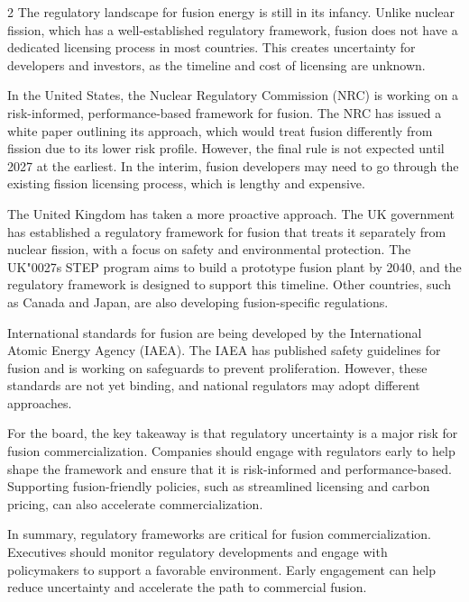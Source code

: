 \documentclass[10pt,a4paper]{article}
\newcommand{\BOApos}{{\BOQuoteFont\char"0027}}
\begin{document}
\begin{multicols}{2}
{\small The regulatory landscape for fusion energy is still in its infancy. Unlike nuclear fission, which has a well-established regulatory framework, fusion does not have a dedicated licensing process in most countries. This creates uncertainty for developers and investors, as the timeline and cost of licensing are unknown.}\par
{\small In the United States, the Nuclear Regulatory Commission (NRC) is working on a risk-informed, performance-based framework for fusion. The NRC has issued a white paper outlining its approach, which would treat fusion differently from fission due to its lower risk profile. However, the final rule is not expected until 2027 at the earliest. In the interim, fusion developers may need to go through the existing fission licensing process, which is lengthy and expensive.}\par
{\small The United Kingdom has taken a more proactive approach. The UK government has established a regulatory framework for fusion that treats it separately from nuclear fission, with a focus on safety and environmental protection. The UK\BOApos{}s STEP program aims to build a prototype fusion plant by 2040, and the regulatory framework is designed to support this timeline. Other countries, such as Canada and Japan, are also developing fusion-specific regulations.}\par
{\small International standards for fusion are being developed by the International Atomic Energy Agency (IAEA). The IAEA has published safety guidelines for fusion and is working on safeguards to prevent proliferation. However, these standards are not yet binding, and national regulators may adopt different approaches.}\par
{\small For the board, the key takeaway is that regulatory uncertainty is a major risk for fusion commercialization. Companies should engage with regulators early to help shape the framework and ensure that it is risk-informed and performance-based. Supporting fusion-friendly policies, such as streamlined licensing and carbon pricing, can also accelerate commercialization.}\par
{\small In summary, regulatory frameworks are critical for fusion commercialization. Executives should monitor regulatory developments and engage with policymakers to support a favorable environment. Early engagement can help reduce uncertainty and accelerate the path to commercial fusion.}\par
\end{multicols}
\label{chap:6:end}
\end{document}
